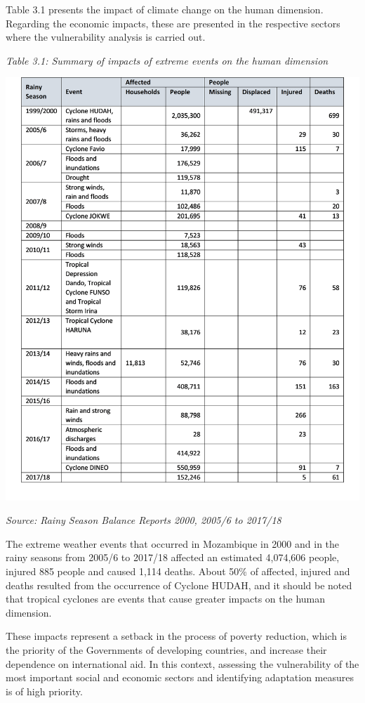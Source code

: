 \documentclass[
]{book}
\begin{document}
Table 3.1 presents the impact of climate change on the human dimension. Regarding the economic impacts, these are presented in the respective sectors where the vulnerability analysis is carried out.

\emph{Table 3.1: Summary of impacts of extreme events on the human dimension}

\includegraphics{Figure24.png}

\emph{Source: Rainy Season Balance Reports 2000, 2005/6 to 2017/18}

The extreme weather events that occurred in Mozambique in 2000 and in the rainy seasons from 2005/6 to 2017/18 affected an estimated 4,074,606 people, injured 885 people and caused 1,114 deaths. About 50\% of affected, injured and deaths resulted from the occurrence of Cyclone HUDAH, and it should be noted that tropical cyclones are events that cause greater impacts on the human dimension.

These impacts represent a setback in the process of poverty reduction, which is the priority of the Governments of developing countries, and increase their dependence on international aid. In this context, assessing the vulnerability of the most important social and economic sectors and identifying adaptation measures is of high priority.
\end{document}
